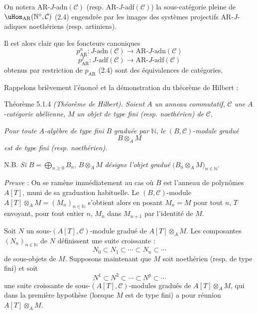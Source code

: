 On notera AR-\(J\)-adn\((\mathcal{C})\) (resp. AR-\(J\)-adf\((\mathcal{C})\)) la sous-catégorie pleine de \(\uHom_{\mathrm{AR}}(\mathbb{N}^\circ,\mathcal{C})\) (2.4) engendrée par les images des systèmes projectifs AR-\(J\)-adiques noethériens (resp. artiniens).

Il est alors clair que les foncteurs canoniques
\[
p^n_{\mathrm{AR}}:J\text{-adn}(\mathcal{C})\longrightarrow \mathrm{AR}\text{-}J\text{-adn}(\mathcal{C})
\]
\[
p^f_{\mathrm{AR}}:J\text{-adf}(\mathcal{C})\longrightarrow \mathrm{AR}\text{-}J\text{-adf}(\mathcal{C})
\]
obtenus par restriction de \(p_{\mathrm{AR}}\) (2.4) sont des équivalences de catégories.

Rappelons brièvement l'énoncé et la démonstration du théorème de Hilbert :

\begin{statement}{Théorème 5.1.4}
\emph{(Théorème de Hilbert). Soient \(A\) un anneau commutatif,} \(\mathcal{C}\) \emph{une} \(A\)-\emph{catégorie abélienne,} \(M\) \emph{un objet de type fini (resp. noethérien) de} \(\mathcal{C}\).

\emph{Pour toute \(A\)-algèbre de type fini} \(B\) \emph{graduée par} \(\mathbb{N}\), \emph{le} \((B,\mathcal{C})\)-\emph{module gradué}
\[
B\otimes_A M
\]
\emph{est de type fini} \emph{(resp. noethérien)}.

N.B. \emph{Si} \(B=\bigoplus_{n\ge0}B_n\), \(B\otimes_A M\) \emph{désigne l'objet gradué} \(\bigl(B_n\otimes_A M\bigr)_{n\in\mathbb{N}}\).
\end{statement}

\emph{Preuve} : On se ramène immédiatement au cas où \(B\) est l'anneau de polynômes \(A[T]\), muni de sa graduation habituelle. Le \((B,\mathcal{C})\)-module \(A[T]\otimes_A M=(M_n)_{n\in\mathbb{N}}\) s'obtient alors en posant \(M_n=M\) pour tout \(n\), \(T\) envoyant, pour tout entier \(n\), \(M_n\) dans \(M_{n+1}\) par l'identité de \(M\).

Soit \(N\) un sous-\((A[T],\mathcal{C})\)-module gradué de \(A[T]\otimes_A M\). Les composantes \((N_n)_{n\in\mathbb{N}}\) de \(N\) définissent une suite croissante :
\[
N_0\subset N_1\subset\cdots\subset N_n\subset\cdots
\]
de
sous-objets de \(M\). Supposons maintenant que \(M\) soit noethérien (resp. de type fini) et soit
\[
N^1\subset N^2\subset\cdots\subset N^p\subset\cdots
\]
une suite croissante de sous-\((A[T],\mathcal{C})\)-modules gradués de \(A[T]\otimes_A M\), qui dans la première hypothèse (lorsque \(M\) est de type fini) a pour réunion \(A[T]\otimes_A M\).

